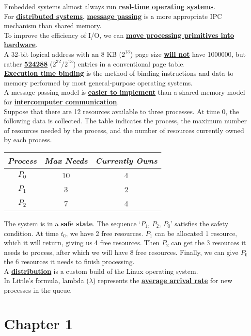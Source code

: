 \documentclass[10pt]{article}
\newcommand{\qw}[1]{\textbf{\ul{#1}}}
\begin{document}
Embedded systems almost always run \qw{real-time operating systems}.\\[2mm]
For \qw{distributed systems}, \qw{message passing} is a more appropriate IPC mechanism than shared memory.\\[2mm]
To improve the efficiency of I/O, we can \qw{move processing primitives into hardware}.\\[2mm]
A 32-bit logical address with an 8 KB ($2^{13}$) page size \qw{will not} have 1000000, but rather \qw{524288} ($2^{32}/2^{13}$) entries in a conventional page table.\\[2mm]
\qw{Execution time binding} is the method of binding instructions and data to memory performed by most general-purpose operating systems.\\[2mm]
A message-passing model is \qw{easier to implement} than a shared memory model for \qw{intercomputer communication}.\\[2mm]
Suppose that there are 12 resources available to three processes. At time 0, the following data is collected. The table indicates the process, the maximum number of resources needed by the process, and the number of resources currently owned by each process.\\
\begin{table}[H]
\centering
\begin{tabular}{ccc}
\textit{Process} & \textit{Max Needs} & \textit{Currently Owns} \\ \hline
$P_0$ & 10 & 4 \\
$P_1$ & 3 & 2 \\
$P_2$ & 7 & 4 \\ \hline
\end{tabular}
\end{table}
The system is in a \qw{safe state}. The sequence `$P_1$, $P_2$, $P_0$' satisfies the safety condition.
At time $t_0$, we have 2 free resources. $P_1$ can be allocated 1 resource, 
which it will return, giving us 4 free resources. Then $P_2$ can get the 3 resources it needs to process,
after which we will have 8 free resources. Finally, we can give $P_0$ the 6 resources it needs to finish processing.\\[2mm]
A \qw{distribution} is a custom build of the Linux operating system.\\[2mm]
In Little's formula, lambda ($\lambda$) represents the \qw{average arrival rate} for new processes in the queue.\\[2mm]

\section{Chapter 1}\newpage
\end{document}
